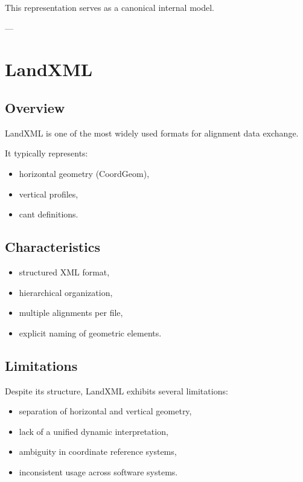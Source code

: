 \begin{remark}
This representation serves as a canonical internal model.
\end{remark}

---

\section{LandXML}

\subsection{Overview}

\begin{remark}
LandXML is one of the most widely used formats for alignment data
exchange.
\end{remark}

\begin{remark}
It typically represents:
\begin{itemize}
\item horizontal geometry (CoordGeom),
\item vertical profiles,
\item cant definitions.
\end{itemize}
\end{remark}

\subsection{Characteristics}

\begin{itemize}
\item structured XML format,
\item hierarchical organization,
\item multiple alignments per file,
\item explicit naming of geometric elements.
\end{itemize}

\subsection{Limitations}

\begin{remark}
Despite its structure, LandXML exhibits several limitations:
\begin{itemize}
\item separation of horizontal and vertical geometry,
\item lack of a unified dynamic interpretation,
\item ambiguity in coordinate reference systems,
\item inconsistent usage across software systems.
\end{itemize}
\end{remark}

